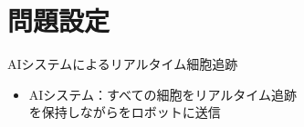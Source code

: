 \section{問題設定}

\begin{frame}{AIシステムによるリアルタイム細胞追跡}
    \begin{itemize}
        \item AIシステム：すべての細胞をリアルタイム追跡
        \\\ra {}を保持しながらをロボットに送信
    \end{itemize}
\end{frame}

